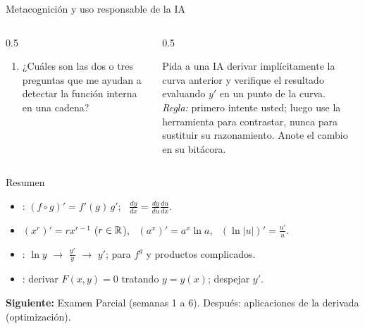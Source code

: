 \documentclass[10pt,aspectratio=169]{beamer}
\begin{document}
\begin{frame}{Metacognición y uso responsable de la IA}
  \small
  \begin{columns}[t]
    \begin{column}{0.5\textwidth}
      \begin{metacog}
        \begin{enumerate}
          \metacomun
          \item ¿Cuáles son las dos o tres preguntas que me ayudan a detectar la función interna en una cadena?
        \end{enumerate}
      \end{metacog}
    \end{column}
    \begin{column}{0.5\textwidth}
      \begin{iabox}
        Pida a una IA derivar implícitamente la curva anterior y verifique el resultado evaluando $y'$ en un punto de la curva.\\[2pt]
        \textit{Regla:} primero intente usted; luego use la herramienta para contrastar, nunca para sustituir su razonamiento. Anote el cambio en su bitácora.
      \end{iabox}
    \end{column}
  \end{columns}
\end{frame}

\begin{frame}{Resumen}
  \begin{itemize}
    \item {}: $(f\circ g)'=f'(g)\,g'$; \ $\frac{dy}{dx}=\frac{dy}{du}\frac{du}{dx}$.
    \item $(x^r)'=rx^{r-1}$ ($r\in\mathbb{R}$), \ $(a^x)'=a^x\ln a$, \ $(\ln|u|)'=\frac{u'}{u}$.
    \item {}: $\ln y$ $\to$ $\frac{y'}{y}$ $\to$ $y'$; para $f^g$ y productos complicados.
    \item {}: derivar $F(x,y)=0$ tratando $y=y(x)$; despejar $y'$.
  \end{itemize}
  \vspace{3mm}
  \textbf{Siguiente:} Examen Parcial (semanas 1 a 6). Después: aplicaciones de la derivada (optimización).
\end{frame}
\end{document}

